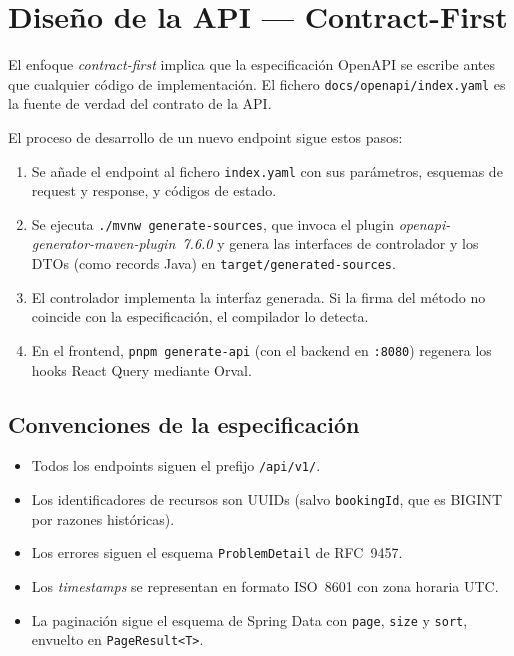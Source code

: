 \section{Diseño de la API — Contract-First}
\label{sec:diseno_api}

El enfoque \textit{contract-first} implica que la especificación OpenAPI se
escribe antes que cualquier código de implementación. El fichero
\texttt{docs/openapi/index.yaml} es la fuente de verdad del contrato de la API.

El proceso de desarrollo de un nuevo endpoint sigue estos pasos:
\begin{enumerate}
  \item Se añade el endpoint al fichero \texttt{index.yaml} con sus parámetros,
    esquemas de request y response, y códigos de estado.
  \item Se ejecuta \texttt{./mvnw generate-sources}, que invoca el plugin
    \textit{openapi-generator-maven-plugin~7.6.0} y genera las interfaces de
    controlador y los DTOs (como records Java) en \texttt{target/generated-sources}.
  \item El controlador implementa la interfaz generada. Si la firma del método no
    coincide con la especificación, el compilador lo detecta.
  \item En el frontend, \texttt{pnpm generate-api} (con el backend en
    \texttt{:8080}) regenera los hooks React Query mediante Orval.
\end{enumerate}

\subsection{Convenciones de la especificación}

\begin{itemize}
  \item Todos los endpoints siguen el prefijo \texttt{/api/v1/}.
  \item Los identificadores de recursos son UUIDs (salvo \texttt{bookingId},
    que es BIGINT por razones históricas).
  \item Los errores siguen el esquema \texttt{ProblemDetail} de RFC~9457.
  \item Los \textit{timestamps} se representan en formato ISO~8601 con zona
    horaria UTC.
  \item La paginación sigue el esquema de Spring Data con \texttt{page},
    \texttt{size} y \texttt{sort}, envuelto en \texttt{PageResult<T>}.
\end{itemize}

